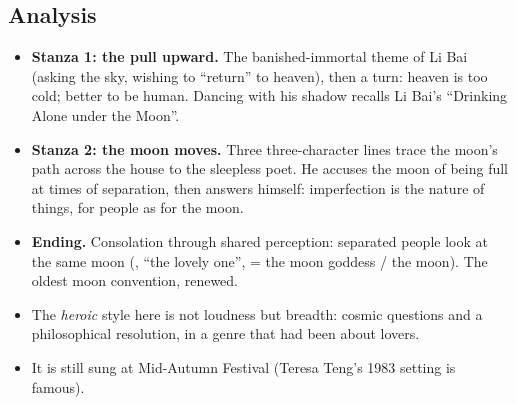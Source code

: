 \begin{center}
\end{center}

\subsection{Analysis}
\begin{itemize}
  \item \textbf{Stanza 1: the pull upward.} The banished-immortal theme of Li Bai (asking the
        sky, wishing to ``return'' to heaven), then a turn: heaven is too cold; better to be
        human. Dancing with his shadow recalls Li Bai's ``Drinking Alone under the
        Moon''.
  \item \textbf{Stanza 2: the moon moves.} Three three-character lines trace the moon's path
        across the house to the sleepless poet. He accuses the moon of being full at
        times of separation, then answers himself: imperfection is the nature of things,
        for people as for the moon.
  \item \textbf{Ending.} Consolation through shared perception: separated people look at the
        same moon (, ``the lovely one'', = the moon goddess / the moon). The
        oldest moon convention, renewed.
  \item The \emph{heroic} style here is not loudness but breadth: cosmic questions and a
        philosophical resolution, in a genre that had been about lovers.
  \item It is still sung at Mid-Autumn Festival (Teresa Teng's 1983 setting
         is famous).
\end{itemize}

